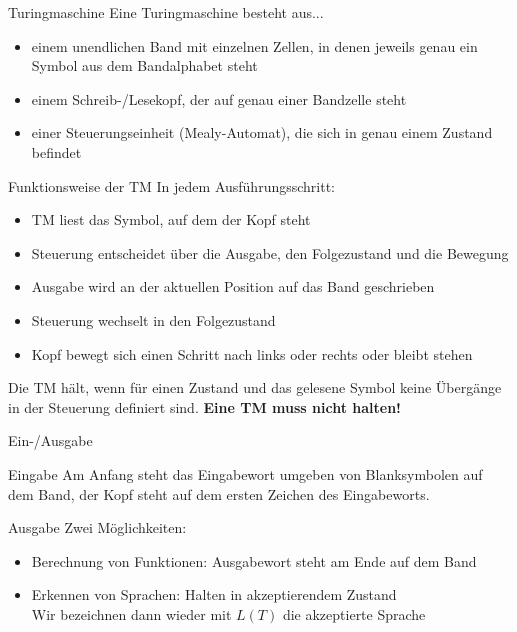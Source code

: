 \begin{frame}{Turingmaschine}
	Eine Turingmaschine besteht aus...
	\begin{itemize}[<+->]
		\item einem unendlichen Band mit einzelnen Zellen, in denen jeweils genau ein Symbol aus dem Bandalphabet steht
		\item einem Schreib-/Lesekopf, der auf genau einer Bandzelle steht
		\item einer Steuerungseinheit (Mealy-Automat), die sich in genau einem Zustand befindet
	\end{itemize}
\end{frame}

\begin{frame}{Funktionsweise der TM}
	In jedem Ausführungsschritt:
	\begin{itemize}[<+->]
		\item TM liest das Symbol, auf dem der Kopf steht
		\item Steuerung entscheidet über die Ausgabe, den Folgezustand und die Bewegung
		\item Ausgabe wird an der aktuellen Position auf das Band geschrieben
		\item Steuerung wechselt in den Folgezustand
		\item Kopf bewegt sich einen Schritt nach links oder rechts oder bleibt stehen
	\end{itemize}
	\pause
	Die TM hält, wenn für einen Zustand und das gelesene Symbol keine Übergänge in der Steuerung definiert sind. \textbf{Eine TM muss nicht halten!}
\end{frame}

\begin{frame}{Ein-/Ausgabe}
	\begin{block}{Eingabe}
		Am Anfang steht das Eingabewort umgeben von Blanksymbolen auf dem Band, der Kopf steht auf dem ersten Zeichen des Eingabeworts.
	\end{block}
	\pause
	
	\begin{block}{Ausgabe}
		Zwei Möglichkeiten:
		\begin{itemize}[<+->]
			\item Berechnung von Funktionen: Ausgabewort steht am Ende auf dem Band
			\item Erkennen von Sprachen: Halten in akzeptierendem Zustand\\
				  Wir bezeichnen dann wieder mit $L(T)$ die akzeptierte Sprache
		\end{itemize}
	\end{block}
\end{frame}


